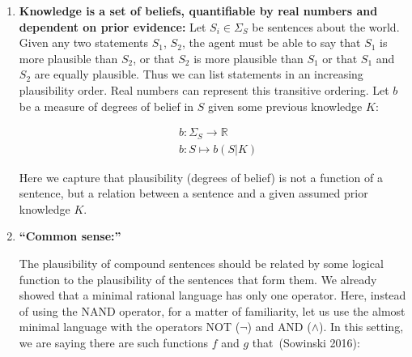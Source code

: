 \documentclass[
  letterpaper,
  12pt,
  british]{tufte-book}
\theoremstyle{plain}
\theoremstyle{definition}
\theoremstyle{plain}
\theoremstyle{remark}
\begin{document}
\begin{enumerate}
\def\labelenumi{\roman{enumi}.}
\item
  \textbf{Knowledge is a set of beliefs, quantifiable by real numbers
  and dependent on prior evidence:} Let \(S_i \in \Sigma_S\) be
  sentences about the world. Given any two statements \(S_1\), \(S_2\),
  the agent must be able to say that \(S_1\) is more plausible than
  \(S_2\), or that \(S_2\) is more plausible than \(S_1\) or that
  \(S_1\) and \(S_2\) are equally plausible. Thus we can list statements
  in an increasing plausibility order. Real numbers can represent this
  transitive ordering. Let
  \(b\) be a measure of degrees of belief in \(S\) given some previous
  knowledge \(K\): 

  \begin{align}
          &b: \Sigma_S \to \mathbb{R}\\
          &b: S \mapsto b(S|K)
  \end{align}

  Here we capture that plausibility (degrees of belief) is not a
  function of a sentence, but a relation between a sentence and a given
  assumed prior knowledge \(K\).
\item
  \textbf{``Common sense:''}

  The plausibility of compound sentences should be related by some
  logical function to the plausibility of the sentences that form them.
  We already showed that a minimal rational language has only one
  operator. Here, instead of using the {NAND} operator, for a matter of
  familiarity, let us use the almost minimal language with the operators
  {NOT} (\(\neg\)) and {AND} (\(\land\)). In this setting, we are saying
  there are such functions \(f\) and \(g\) that~(Sowinski
  2016):


\end{enumerate}
\end{document}
